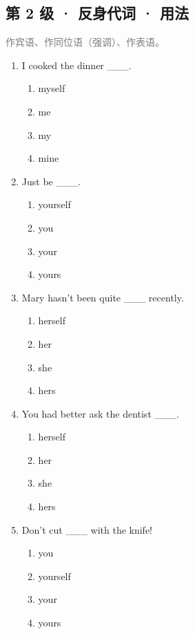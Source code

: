 \documentclass[11pt,a4paper]{ctexart}
\begin{document}
\subsection*{第 2 级 · 反身代词 · 用法}
\noindent\textcolor{gray}{作宾语、作同位语（强调）、作表语。}\par\smallskip
\begin{enumerate}[leftmargin=*,itemsep=4pt]
\item I cooked the dinner \_\_\_.
\begin{enumerate}[label=\Alph*.,leftmargin=2em,itemsep=1pt,topsep=2pt]
\item myself
\item me
\item my
\item mine
\end{enumerate}
\item Just be \_\_\_.
\begin{enumerate}[label=\Alph*.,leftmargin=2em,itemsep=1pt,topsep=2pt]
\item yourself
\item you
\item your
\item yours
\end{enumerate}
\item Mary hasn’t been quite \_\_\_ recently.
\begin{enumerate}[label=\Alph*.,leftmargin=2em,itemsep=1pt,topsep=2pt]
\item herself
\item her
\item she
\item hers
\end{enumerate}
\item You had better ask the dentist \_\_\_.
\begin{enumerate}[label=\Alph*.,leftmargin=2em,itemsep=1pt,topsep=2pt]
\item herself
\item her
\item she
\item hers
\end{enumerate}
\item Don’t cut \_\_\_ with the knife!
\begin{enumerate}[label=\Alph*.,leftmargin=2em,itemsep=1pt,topsep=2pt]
\item you
\item yourself
\item your
\item yours
\end{enumerate}

\end{enumerate}
\end{document}
